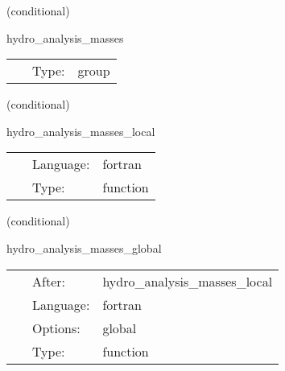 \vspace{5mm}

   (conditional) 

\hspace{5mm} hydro\_analysis\_masses 

\hspace{5mm}{\it computation of rest masses contained within given radii } 


\hspace{5mm}

 \begin{tabular*}{160mm}{cll} 
~ & Type:  & group \\ 
\end{tabular*} 


\vspace{5mm}

   (conditional) 

\hspace{5mm} hydro\_analysis\_masses\_local 

\hspace{5mm}{\it rest masses within given radii, local calculations } 


\hspace{5mm}

 \begin{tabular*}{160mm}{cll} 
~ & Language:  & fortran \\ 
~ & Type:  & function \\ 
\end{tabular*} 


\vspace{5mm}

   (conditional) 

\hspace{5mm} hydro\_analysis\_masses\_global 

\hspace{5mm}{\it rest masses within given radii, reduction operation } 


\hspace{5mm}

 \begin{tabular*}{160mm}{cll} 
~ & After:  & hydro\_analysis\_masses\_local \\ 
~ & Language:  & fortran \\ 
~ & Options:  & global \\ 
~ & Type:  & function \\ 
\end{tabular*} 


